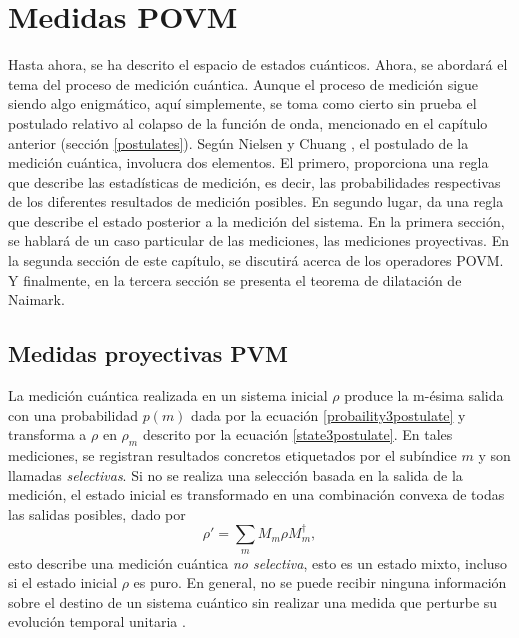 \chapter{Medidas POVM}\label{MedidaPOVM}
Hasta ahora, se ha descrito el espacio de estados cuánticos. Ahora, se abordará el tema del proceso de medición cuántica. Aunque el proceso de medición  sigue siendo algo enigmático, aquí simplemente, se toma como cierto sin prueba el postulado relativo al colapso de la función de onda, mencionado en el capítulo anterior (sección {\ref{postulates}}). Según Nielsen y Chuang {\cite{nielsen_chuang_2010}}, el postulado de la medici\'on cuántica, involucra dos elementos. El primero, proporciona una regla que describe las estadísticas de medición, es decir, las probabilidades respectivas de los diferentes resultados de medición posibles. En segundo lugar, da una regla que describe el estado posterior a la medición del sistema.  En la primera sección, se hablará de un caso particular de las mediciones, las mediciones proyectivas. En la segunda sección de este capítulo, se discutirá acerca de los operadores POVM\@. Y finalmente, en la tercera sección se presenta el teorema de dilatación de Naimark. 











\section{Medidas proyectivas PVM}
La medición cuántica realizada en un sistema inicial $\rho$ produce  la m-ésima salida con una probabilidad $p(m)$ dada por la ecuación {\ref{probaility3postulate}} y transforma a $\rho $ en $\rho_m$ descrito por la ecuación {\ref{state3postulate}}. En tales mediciones, se registran resultados concretos etiquetados por el subíndice $m$ y son llamadas \textit{selectivas}. Si no se realiza una selección basada en la salida de la medición, el estado inicial es transformado en una combinación convexa de todas las salidas posibles, dado por 
\begin{equation}\label{non-selective-measure}
	\rho'=\sum_m M_m\rho M_m^\dagger,
\end{equation}
esto describe una medición cuántica \textit{no selectiva}, esto es un estado mixto, incluso si el estado inicial $\rho$ es puro. En general, no se puede recibir ninguna información sobre el destino de un sistema cuántico sin realizar una medida que perturbe su evolución temporal unitaria {\cite{2007geometry}}.

